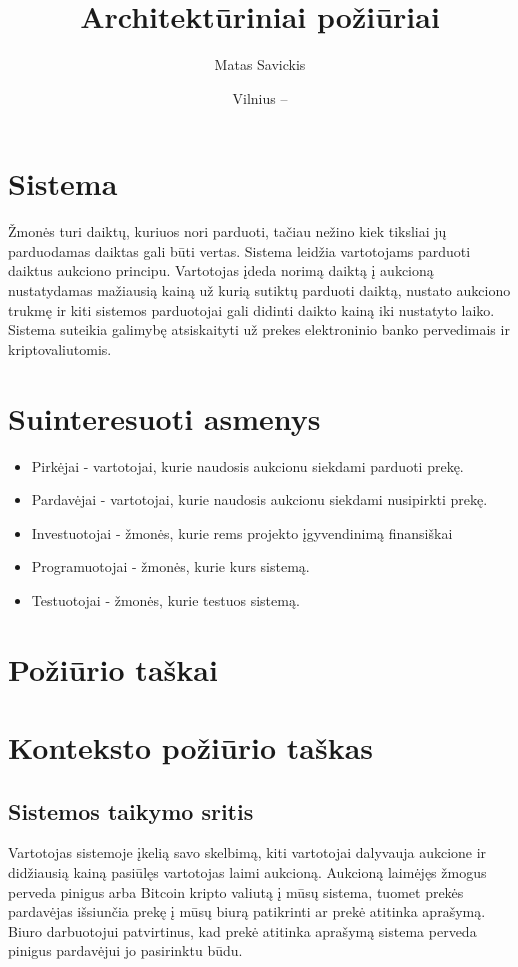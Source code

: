 \documentclass{VUMIFPSmagistrinis}
\title{Architektūriniai požiūriai}
\author{Matas Savickis}
\date{Vilnius – \the\year}
\begin{document}
\maketitle

\tableofcontents
	\section{Sistema}
		Žmonės turi daiktų, kuriuos nori parduoti, tačiau nežino kiek tiksliai jų parduodamas daiktas gali būti vertas.
		Sistema leidžia vartotojams parduoti daiktus aukciono principu.
		Vartotojas įdeda norimą daiktą į aukcioną nustatydamas mažiausią kainą už kurią sutiktų parduoti daiktą, nustato aukciono trukmę ir kiti sistemos parduotojai gali didinti daikto kainą iki nustatyto laiko.
		Sistema suteikia galimybę atsiskaityti už prekes elektroninio banko pervedimais ir kriptovaliutomis.
	\section{Suinteresuoti asmenys}
		\begin{itemize}
			\item{Pirkėjai - vartotojai, kurie naudosis aukcionu siekdami parduoti prekę.}
			\item{Pardavėjai - vartotojai, kurie naudosis aukcionu siekdami nusipirkti prekę.}
			\item{Investuotojai - žmonės, kurie rems projekto įgyvendinimą finansiškai}
			\item{Programuotojai - žmonės, kurie kurs sistemą.}
			\item{Testuotojai - žmonės, kurie testuos sistemą.}
		\end{itemize}
	\section{Požiūrio taškai}
		\section{Konteksto požiūrio taškas}
			\subsection{Sistemos taikymo sritis}
				Vartotojas sistemoje įkelią savo skelbimą, kiti vartotojai dalyvauja aukcione ir didžiausią kainą pasiūlęs vartotojas laimi aukcioną.
				Aukcioną laimėjęs žmogus perveda pinigus arba Bitcoin kripto valiutą į mūsų sistema, tuomet prekės pardavėjas išsiunčia prekę į mūsų biurą patikrinti ar prekė atitinka aprašymą. 
				Biuro darbuotojui patvirtinus, kad prekė atitinka aprašymą sistema perveda pinigus pardavėjui jo pasirinktu būdu.
\end{document}
